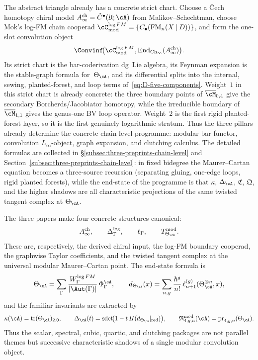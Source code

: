 \begin{summary}
\label{sum:three-pillars-chain-level}
The abstract triangle already has a concrete strict chart.  Choose a
\v{C}ech homotopy chiral model
$A^{\mathrm{ch}}_\infty=\check C^\bullet(\mathfrak U;\cA)$ from
Malikov--Schechtman, choose Mok's log-FM chain cooperad
$\cC^{\log FM}_{\mathrm{mod}}=\{C_\bullet(\operatorname{FM}_n(X\mathbin{|}D))\}$,
and form the one-slot convolution object
\[
\Convinf\!\bigl(
\cC^{\log FM}_{\mathrm{mod}},
\operatorname{End}_{\mathrm{Ch}_\infty}(A^{\mathrm{ch}}_\infty)
\bigr).
\]
Its strict chart is the bar-coderivation dg~Lie algebra, its Feynman
expansion is the stable-graph formula for~$\Theta_\cA$, and its
differential splits into the internal, sewing, planted-forest, and loop
terms of~\eqref{eq:D-five-components}.  Weight~$1$ in this strict
chart is already concrete: the three boundary points of
$\overline{\cM}_{0,4}$ give the secondary Borcherds/Jacobiator homotopy,
while the irreducible boundary of $\overline{\cM}_{1,1}$ gives the
genus-one BV loop operator.  Weight~$2$ is the first rigid
planted-forest layer, so it is the first genuinely logarithmic stratum.
Thus the three pillars already determine the concrete chain-level
programme: modular bar functor, convolution $L_\infty$-object, graph
expansion, and clutching calculus.  The detailed formulas are collected
in \S\ref{subsec:three-preprints-chain-level} and
Section~\ref{subsec:three-preprints-chain-level}: in fixed
bidegree the Maurer--Cartan equation becomes a three-source recursion
(separating gluing, one-edge loops, rigid planted forests), while the
end-state of the programme is that $\kappa$, $\Delta_\cA$,
$\mathfrak{C}$, $\mathfrak{Q}$, and the higher shadows are all
characteristic projections of the same twisted tangent complex at
$\Theta_\cA$.
\end{summary}

\begin{summary}
\label{sum:platonic-end-state}
The three papers make four concrete structures canonical:
\[
A^{\mathrm{ch}}_\infty,
\qquad
\Delta^{\log}_\Gamma,
\qquad
\ell_\Gamma,
\qquad
T^{\mathrm{mod}}_{\Theta_\cA}.
\]
These are, respectively, the derived chiral input, the log-FM boundary
cooperad, the graphwise Taylor coefficients, and the twisted tangent
complex at the universal modular Maurer--Cartan point.  The end-state
formula is
\[
\Theta_\cA
=
\sum_\Gamma \frac{W^{\log FM}_\Gamma}{|\Aut(\Gamma)|}\,\Phi^\cA_\Gamma,
\qquad
 d_{\Theta_\cA}(x)
 =
 \sum_{n,g}\frac{\hbar^g}{n!}\,\ell_{n+1}^{(g)}(\Theta_\cA^{\otimes n},x),
\]
and the familiar invariants are extracted by
\[
\kappa(\cA)=\operatorname{tr}(\Theta_\cA)_{2,0},
\qquad
\Delta_\cA(t)=\operatorname{sdet}\!\bigl(1-t\,H(d_{\Theta_\cA}|_{\mathrm{red}})\bigr),
\qquad
\mathfrak R^{\mathrm{mod}}_{4,g,n}(\cA)=\operatorname{pr}_{4,g,n}(\Theta_\cA).
\]
Thus the scalar, spectral, cubic, quartic, and clutching packages are
not parallel themes but successive characteristic shadows of a single
modular convolution object.
\end{summary}


